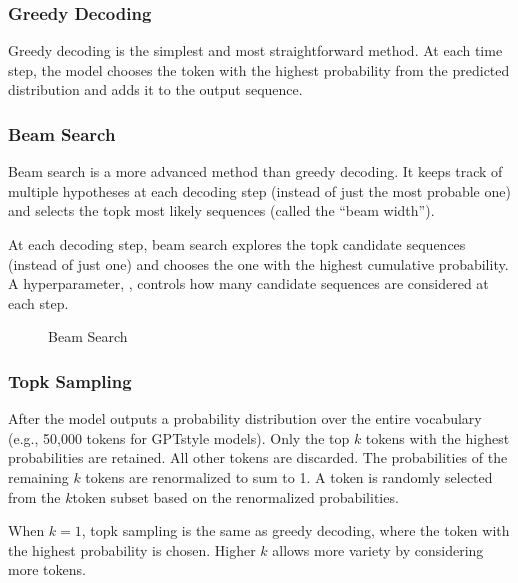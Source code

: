 \documentclass[letterpaper,11pt,english]{sphinxmanual}
\begin{document}
\subsubsection{Greedy Decoding}
\label{\detokenize{pretraining:greedy-decoding}}
\sphinxAtStartPar
Greedy decoding is the simplest and most straightforward method. At each
time step, the model chooses the token with the highest probability from
the predicted distribution and adds it to the output sequence.


\subsubsection{Beam Search}
\label{\detokenize{pretraining:beam-search}}
\sphinxAtStartPar
Beam search is a more advanced method than greedy decoding. It keeps
track of multiple hypotheses at each decoding step (instead of just the
most probable one) and selects the top\sphinxhyphen{}k most likely sequences (called
the “beam width”).

\sphinxAtStartPar
At each decoding step, beam search explores the top\sphinxhyphen{}k candidate
sequences (instead of just one) and chooses the one with the highest
cumulative probability. A hyperparameter, , controls how
many candidate sequences are considered at each step.

\begin{figure}[htbp]
\centering
\capstart

\noindent{}
\caption{Beam Search}\label{\detokenize{pretraining:id19}}\end{figure}


\subsubsection{Top\sphinxhyphen{}k Sampling}
\label{\detokenize{pretraining:top-k-sampling}}
\sphinxAtStartPar
After the model outputs a probability distribution over the entire
vocabulary (e.g., 50,000 tokens for GPT\sphinxhyphen{}style models). Only the top
\(k\) tokens with the highest probabilities are retained. All other
tokens are discarded. The probabilities of the remaining \(k\)
tokens are renormalized to sum to 1. A token is randomly selected from
the \(k\)\sphinxhyphen{}token subset based on the renormalized probabilities.

\sphinxAtStartPar
When \(k=1\), top\sphinxhyphen{}k sampling is the same as greedy decoding, where
the token with the highest probability is chosen. Higher \(k\)
allows more variety by considering more tokens.
\end{document}
